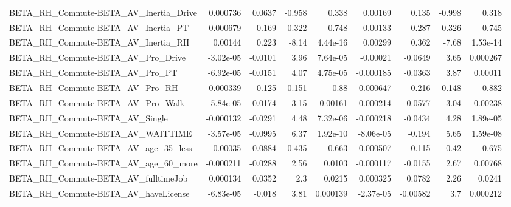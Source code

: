 \begin{tabular}{lrrrrrrrr}
BETA\_RH\_Commute-BETA\_AV\_Inertia\_Drive              &    0.000736 &       0.0637 &   -0.958 &    0.338 &    0.00169 &       0.135 &       -0.998 &         0.318 \\
BETA\_RH\_Commute-BETA\_AV\_Inertia\_PT                 &    0.000679 &        0.169 &    0.322 &    0.748 &    0.00133 &       0.287 &        0.326 &         0.745 \\
BETA\_RH\_Commute-BETA\_AV\_Inertia\_RH                 &     0.00144 &        0.223 &    -8.14 & 4.44e-16 &    0.00299 &       0.362 &        -7.68 &      1.53e-14 \\
BETA\_RH\_Commute-BETA\_AV\_Pro\_Drive                  &   -3.02e-05 &      -0.0101 &     3.96 & 7.64e-05 &   -0.00021 &     -0.0649 &         3.65 &      0.000267 \\
BETA\_RH\_Commute-BETA\_AV\_Pro\_PT                     &   -6.92e-05 &      -0.0151 &     4.07 & 4.75e-05 &  -0.000185 &     -0.0363 &         3.87 &       0.00011 \\
BETA\_RH\_Commute-BETA\_AV\_Pro\_RH                     &    0.000339 &        0.125 &    0.151 &     0.88 &   0.000647 &       0.216 &        0.148 &         0.882 \\
BETA\_RH\_Commute-BETA\_AV\_Pro\_Walk                   &    5.84e-05 &       0.0174 &     3.15 &  0.00161 &   0.000214 &      0.0577 &         3.04 &       0.00238 \\
BETA\_RH\_Commute-BETA\_AV\_Single                     &   -0.000132 &      -0.0291 &     4.48 & 7.32e-06 &  -0.000218 &     -0.0434 &         4.28 &      1.89e-05 \\
BETA\_RH\_Commute-BETA\_AV\_WAITTIME                   &   -3.57e-05 &      -0.0995 &     6.37 & 1.92e-10 &  -8.06e-05 &      -0.194 &         5.65 &      1.59e-08 \\
BETA\_RH\_Commute-BETA\_AV\_age\_35\_less                &     0.00035 &       0.0884 &    0.435 &    0.663 &   0.000507 &       0.115 &         0.42 &         0.675 \\
BETA\_RH\_Commute-BETA\_AV\_age\_60\_more                &   -0.000211 &      -0.0288 &     2.56 &   0.0103 &  -0.000117 &     -0.0155 &         2.67 &       0.00768 \\
BETA\_RH\_Commute-BETA\_AV\_fulltimeJob                &    0.000134 &       0.0352 &      2.3 &   0.0215 &   0.000325 &      0.0782 &         2.26 &        0.0241 \\
BETA\_RH\_Commute-BETA\_AV\_haveLicense                &   -6.83e-05 &       -0.018 &     3.81 & 0.000139 &  -2.37e-05 &    -0.00582 &          3.7 &      0.000212 \\

\end{tabular}
